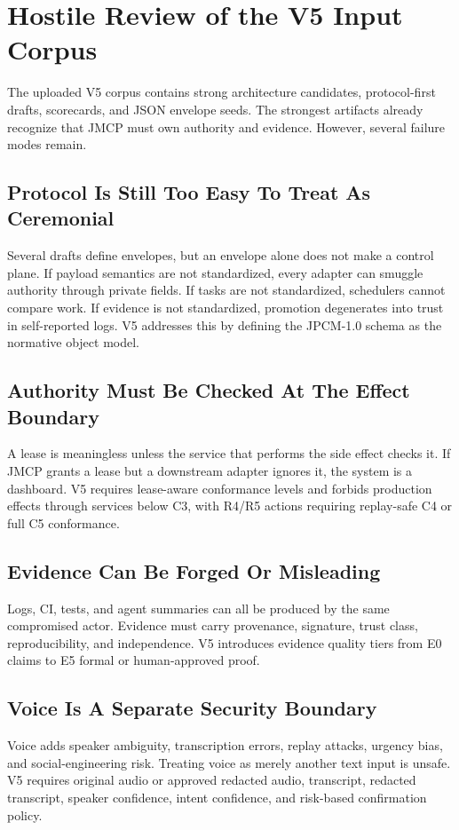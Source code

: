 \documentclass[10pt,journal,onecolumn]{IEEEtran}
\begin{document}
\section{Hostile Review of the V5 Input Corpus}
The uploaded V5 corpus contains strong architecture candidates, protocol-first drafts, scorecards, and JSON envelope seeds. The strongest artifacts already recognize that JMCP must own authority and evidence. However, several failure modes remain.

\subsection{Protocol Is Still Too Easy To Treat As Ceremonial}
Several drafts define envelopes, but an envelope alone does not make a control plane. If payload semantics are not standardized, every adapter can smuggle authority through private fields. If tasks are not standardized, schedulers cannot compare work. If evidence is not standardized, promotion degenerates into trust in self-reported logs. V5 addresses this by defining the JPCM-1.0 schema as the normative object model.

\subsection{Authority Must Be Checked At The Effect Boundary}
A lease is meaningless unless the service that performs the side effect checks it. If JMCP grants a lease but a downstream adapter ignores it, the system is a dashboard. V5 requires lease-aware conformance levels and forbids production effects through services below C3, with R4/R5 actions requiring replay-safe C4 or full C5 conformance.

\subsection{Evidence Can Be Forged Or Misleading}
Logs, CI, tests, and agent summaries can all be produced by the same compromised actor. Evidence must carry provenance, signature, trust class, reproducibility, and independence. V5 introduces evidence quality tiers from E0 claims to E5 formal or human-approved proof.

\subsection{Voice Is A Separate Security Boundary}
Voice adds speaker ambiguity, transcription errors, replay attacks, urgency bias, and social-engineering risk. Treating voice as merely another text input is unsafe. V5 requires original audio or approved redacted audio, transcript, redacted transcript, speaker confidence, intent confidence, and risk-based confirmation policy.
\end{document}
